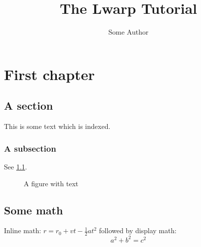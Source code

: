 \documentclass{book}
\title{The Lwarp Tutorial}
\author{Some Author}
\begin{document}
\maketitle %
\tableofcontents %
\listoffigures
\chapter{First chapter}
\section{A section}
This is some text which is indexed.
\subsection{A subsection}
See \cref{fig:withtext}.
\begin{figure}\begin{center}
\fbox{\textcolor{blue!50!green}{Text in a figure.}}
\caption{A figure with text\label{fig:withtext}}
\end{center}\end{figure}
\section{Some math}
Inline math: $r = r_0 + vt - \frac{1}{2}at^2$
followed by display math:
\begin{equation}
a^2 + b^2 = c^2
\end{equation}
\begin{warpprint} %
\cleardoublepage %
{}
\end{warpprint}
\ForceHTMLPage %
\ForceHTMLTOC %
\printindex
\end{document}
